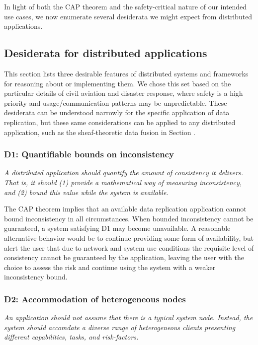 In light of both the CAP theorem and the safety-critical nature of our
intended use cases, we now enumerate several desiderata we might
expect from distributed applications.

\subsection{Desiderata for distributed applications}

This section lists three desirable features of distributed systems and
frameworks for reasoning about or implementing them. We chose this set
based on the particular details of civil aviation and disaster
response, where safety is a high priority and usage/communication
patterns may be unpredictable. These desiderata can be understood
narrowly for the specific application of data replication, but these
same considerations can be applied to any distributed application,
such as the sheaf-theoretic data fusion in Section \cite{}.

\subsubsection*{D1: Quantifiable bounds on inconsistency}

\emph{A distributed application should quantify the amount of consistency
it delivers. That is, it should (1) provide a mathematical way of
measuring inconsistency, and (2) bound this value while the system is
available.}

The CAP theorem implies that an available data replication application
cannot bound inconsistency in all circumstances. When bounded
inconsistency cannot be guaranteed, a system satisfying D1 may become
unavailable. A reasonable alternative behavior would be to continue
providing some form of availability, but alert the user that due to
network and system use conditions the requisite level of consistency
cannot be guaranteed by the application, leaving the user with the
choice to assess the risk and continue using the system with a weaker
inconsistency bound.

\subsubsection*{D2: Accommodation of heterogeneous nodes}

\emph{An application should not assume that there is a typical system
node. Instead, the system should accomdate a diverse range of
heterogeneous clients presenting different capabilities, tasks, and
risk-factors.}

